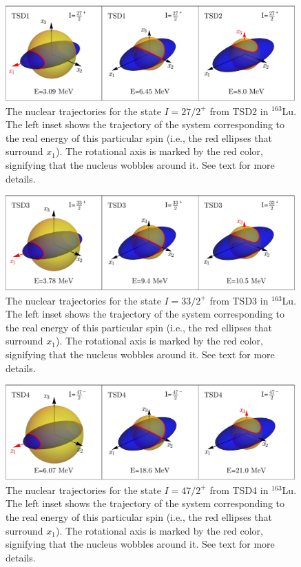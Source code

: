 \begin{figure}
    \centering
    \includegraphics[width=0.99\textwidth]{Chapters/Figures/parity-partners-plots/classical-trajectory-TSD2.pdf}
    \caption{The nuclear trajectories for the state $I=27/2^+$ from TSD2 in $^{163}$Lu. The left inset shows the trajectory of the system corresponding to the real energy of this particular spin (i.e., the red ellipses that surround $x_1$). The rotational axis is marked by the red color, signifying that the nucleus wobbles around it. See text for more details.}
    \label{classical-trajectory-TSD2-plot}
\end{figure}
\begin{figure}
    \centering
    \includegraphics[width=0.99\textwidth]{Chapters/Figures/parity-partners-plots/classical-trajectory-TSD3.pdf}
    \caption{The nuclear trajectories for the state $I=33/2^+$ from TSD3 in $^{163}$Lu. The left inset shows the trajectory of the system corresponding to the real energy of this particular spin (i.e., the red ellipses that surround $x_1$). The rotational axis is marked by the red color, signifying that the nucleus wobbles around it. See text for more details.}
    \label{classical-trajectory-TSD3-plot}
\end{figure}
\begin{figure}
    \centering
    \includegraphics[width=0.99\textwidth]{Chapters/Figures/parity-partners-plots/classical-trajectory-TSD4.pdf}
    \caption{The nuclear trajectories for the state $I=47/2^+$ from TSD4 in $^{163}$Lu. The left inset shows the trajectory of the system corresponding to the real energy of this particular spin (i.e., the red ellipses that surround $x_1$). The rotational axis is marked by the red color, signifying that the nucleus wobbles around it. See text for more details.}
    \label{classical-trajectory-TSD4-plot}
\end{figure}

